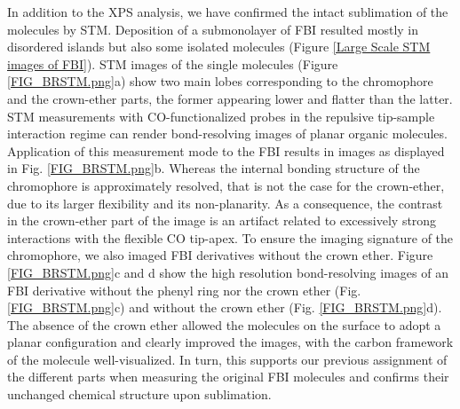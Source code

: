 \documentclass[aps,prl,reprint,longbibliography,superscriptaddress, english]{revtex4-1}
\begin{document}
In addition to the XPS analysis, we have confirmed the intact sublimation of the molecules by STM. Deposition of a submonolayer of FBI resulted mostly in disordered islands but also some isolated molecules (Figure \ref{Large Scale STM images of FBI}). STM images of the single molecules (Figure  \ref{FIG_BRSTM.png}a) show two main lobes corresponding to the chromophore and the crown-ether parts, the former appearing lower and flatter than the latter. STM measurements with CO-functionalized probes in the repulsive tip-sample interaction regime can render bond-resolving images of planar organic molecules.\cite{gross_recent_2011,gross_atomic_2018} Application of this measurement mode to the FBI results in images as displayed in Fig. \ref{FIG_BRSTM.png}b.  Whereas the internal bonding structure of the chromophore is approximately resolved, that is not the case for the crown-ether, due to its larger flexibility and its non-planarity. As a consequence, the contrast in the crown-ether part of the image is an artifact related to excessively strong interactions with the flexible CO tip-apex.\cite{moll_mechanisms_2010,hapala_mechanism_2014} To ensure the imaging signature of the chromophore, we also imaged FBI derivatives without the crown ether. Figure  \ref{FIG_BRSTM.png}c and d show the high resolution bond-resolving images of an FBI derivative without the phenyl ring nor the crown ether (Fig. \ref{FIG_BRSTM.png}c)  and without the crown ether (Fig. \ref{FIG_BRSTM.png}d). The absence of the crown ether allowed the molecules on the surface to adopt a planar configuration and clearly improved the images, with the carbon framework of the molecule well-visualized. In turn, this supports our previous assignment of the different parts when measuring the original FBI molecules and confirms their unchanged chemical structure upon sublimation.  
\end{document}

